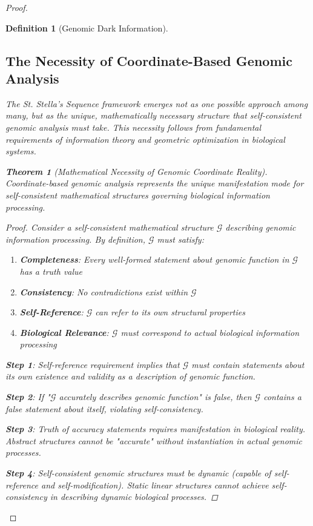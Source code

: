 \documentclass[12pt,a4paper]{article}
\newtheorem{theorem}{Theorem}
\newtheorem{definition}{Definition}
\begin{document}
\begin{proof}
\begin{definition}[Genomic Dark Information]
\begin{algorithm}[H]
\subsection{The Necessity of Coordinate-Based Genomic Analysis}

The St. Stella's Sequence framework emerges not as one possible approach among many, but as the unique, mathematically necessary structure that self-consistent genomic analysis must take. This necessity follows from fundamental requirements of information theory and geometric optimization in biological systems.

\begin{theorem}[Mathematical Necessity of Genomic Coordinate Reality]
Coordinate-based genomic analysis represents the unique manifestation mode for self-consistent mathematical structures governing biological information processing.
\end{theorem}

\begin{proof}
Consider a self-consistent mathematical structure $\mathcal{G}$ describing genomic information processing. By definition, $\mathcal{G}$ must satisfy:
\begin{enumerate}
\item \textbf{Completeness}: Every well-formed statement about genomic function in $\mathcal{G}$ has a truth value
\item \textbf{Consistency}: No contradictions exist within $\mathcal{G}$
\item \textbf{Self-Reference}: $\mathcal{G}$ can refer to its own structural properties
\item \textbf{Biological Relevance}: $\mathcal{G}$ must correspond to actual biological information processing
\end{enumerate}

\textbf{Step 1}: Self-reference requirement implies that $\mathcal{G}$ must contain statements about its own existence and validity as a description of genomic function.

\textbf{Step 2}: If "$\mathcal{G}$ accurately describes genomic function" is false, then $\mathcal{G}$ contains a false statement about itself, violating self-consistency.

\textbf{Step 3}: Truth of accuracy statements requires manifestation in biological reality. Abstract structures cannot be "accurate" without instantiation in actual genomic processes.

\textbf{Step 4}: Self-consistent genomic structures must be dynamic (capable of self-reference and self-modification). Static linear structures cannot achieve self-consistency in describing dynamic biological processes.


\end{proof}
\end{algorithm}
\end{definition}
\end{proof}
\end{document}
